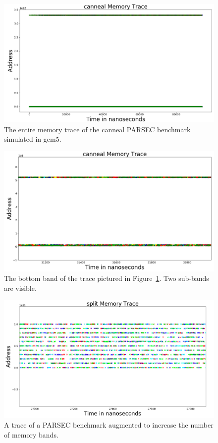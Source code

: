 \begin{figure}[h!]
		\includegraphics[width=\linewidth]{figures/canneal_whole.png}
		\caption{The entire memory trace of the canneal PARSEC benchmark simulated in gem5.}
		\label{fig:canneal_whole}
\end{figure}

\begin{figure}[h!]
		\includegraphics[width=\linewidth]{figures/canneal_trace.png}
		\caption{The bottom band of the trace pictured in Figure~\ref{fig:canneal_whole}. Two sub-bands are visible.}
		\label{fig:canneal_dense}
\end{figure}
		
\begin{figure}[h!]
		\includegraphics[width=\linewidth]{figures/vips_split.png}
		\caption{A trace of a PARSEC benchmark augmented to increase the number of memory bands.}
		\label{fig:vips_split}
\end{figure}

